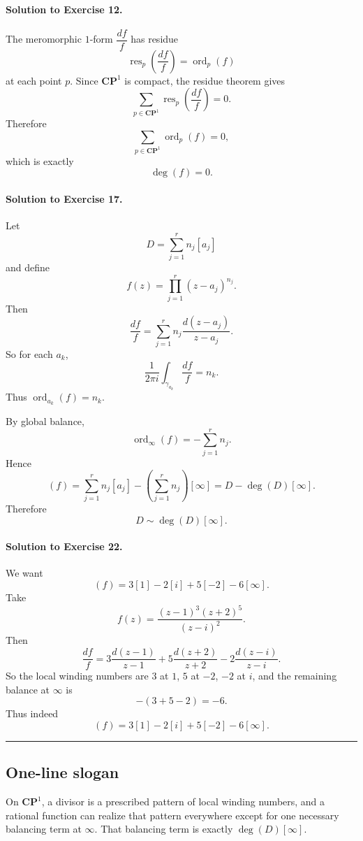 \documentclass[11pt]{article}
\begin{document}
	\paragraph{Solution to Exercise 12.}
	The meromorphic \(1\)-form \(\dfrac{df}{f}\) has residue
	\[
	\operatorname{res}_p\!\left(\frac{df}{f}\right)=\operatorname{ord}_p(f)
	\]
	at each point \(p\). Since \(\mathbf{CP}^1\) is compact, the residue theorem gives
	\[
	\sum_{p\in\mathbf{CP}^1}\operatorname{res}_p\!\left(\frac{df}{f}\right)=0.
	\]
	Therefore
	\[
	\sum_{p\in\mathbf{CP}^1}\operatorname{ord}_p(f)=0,
	\]
	which is exactly
	\[
	\deg (f)=0.
	\]
	
	\paragraph{Solution to Exercise 17.}
	Let
	\[
	D=\sum_{j=1}^r n_j[a_j]
	\]
	and define
	\[
	f(z)=\prod_{j=1}^r (z-a_j)^{n_j}.
	\]
	Then
	\[
	\frac{df}{f}=\sum_{j=1}^r n_j\frac{d(z-a_j)}{z-a_j}.
	\]
	So for each \(a_k\),
	\[
	\frac{1}{2\pi i}\int_{\gamma_{a_k}}\frac{df}{f}=n_k.
	\]
	Thus \(\operatorname{ord}_{a_k}(f)=n_k\).
	
	By global balance,
	\[
	\operatorname{ord}_\infty(f)=-\sum_{j=1}^r n_j.
	\]
	Hence
	\[
	(f)=\sum_{j=1}^r n_j[a_j]-\left(\sum_{j=1}^r n_j\right)[\infty]
	= D-\deg(D)[\infty].
	\]
	Therefore
	\[
	D\sim \deg(D)[\infty].
	\]
	
	\paragraph{Solution to Exercise 22.}
	We want
	\[
	(f)=3[1]-2[i]+5[-2]-6[\infty].
	\]
	Take
	\[
	f(z)=\frac{(z-1)^3(z+2)^5}{(z-i)^2}.
	\]
	Then
	\[
	\frac{df}{f}
	=
	3\frac{d(z-1)}{z-1}
	+
	5\frac{d(z+2)}{z+2}
	-
	2\frac{d(z-i)}{z-i}.
	\]
	So the local winding numbers are \(3\) at \(1\), \(5\) at \(-2\), \(-2\) at \(i\), and the remaining balance at \(\infty\) is
	\[
	-(3+5-2)=-6.
	\]
	Thus indeed
	\[
	(f)=3[1]-2[i]+5[-2]-6[\infty].
	\]
	
	\bigskip
	\hrule
	\bigskip
	
	\subsection*{One-line slogan}
	
	On \(\mathbf{CP}^1\), a divisor is a prescribed pattern of local winding numbers, and a rational function can realize that pattern everywhere except for one necessary balancing term at \(\infty\). That balancing term is exactly \(\deg(D)[\infty]\).
	
\end{document}
